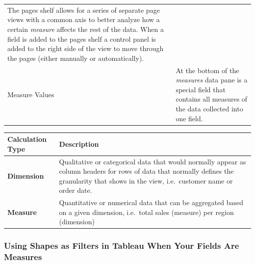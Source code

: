 \documentclass[]{book}
\begin{document}
\begin{longtable}[]{@{}ll@{}}
\begin{minipage}[t]{0.80\columnwidth}
The pages shelf allows for a series of separate page views with a common axis to better analyze how a certain \emph{measure} affects the rest of the data. When a field is added to the pages shelf a control panel is added to the right side of the view to move through the pages (either manually or automatically).\strut
\end{minipage}\tabularnewline
\begin{minipage}[t]{0.15\columnwidth}\raggedright
Measure Values\strut
\end{minipage} & \begin{minipage}[t]{0.80\columnwidth}\raggedright
At the bottom of the \emph{measures} data pane is a special field that contains all measures of the data collected into one field.\strut
\end{minipage}\tabularnewline
\bottomrule
\end{longtable}

\begin{longtable}[]{@{}ll@{}}
\toprule
\begin{minipage}[b]{0.15\columnwidth}\raggedright
\textbf{Calculation Type}\strut
\end{minipage} & \begin{minipage}[b]{0.80\columnwidth}\raggedright
\textbf{Description}\strut
\end{minipage}\tabularnewline
\midrule
\endhead
\begin{minipage}[t]{0.15\columnwidth}\raggedright
\textbf{Dimension}\strut
\end{minipage} & \begin{minipage}[t]{0.80\columnwidth}\raggedright
Qualitative or categorical data that would normally appear as column headers for rows of data that normally defines the granularity that shows in the view, i.e.~customer name or order date.\strut
\end{minipage}\tabularnewline
\begin{minipage}[t]{0.15\columnwidth}\raggedright
\textbf{Measure}\strut
\end{minipage} & \begin{minipage}[t]{0.80\columnwidth}\raggedright
Quantitative or numerical data that can be aggregated based on a given dimension, i.e.~total sales (measure) per region (dimension)\strut
\end{minipage}\tabularnewline
\bottomrule
\end{longtable}

\hypertarget{using-shapes-as-filters-in-tableau-when-your-fields-are-measures}{%
\subsubsection{Using Shapes as Filters in Tableau When Your Fields Are Measures}\label{using-shapes-as-filters-in-tableau-when-your-fields-are-measures}}
\end{document}
